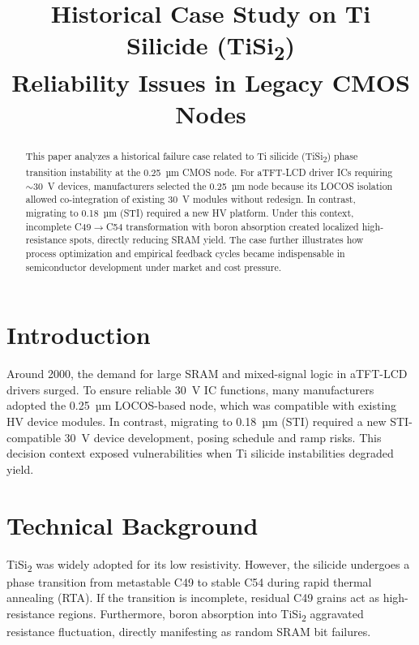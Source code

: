 \documentclass[conference]{IEEEtran}
\begin{document}
\title{Historical Case Study on Ti Silicide (TiSi\textsubscript{2}) \\ Reliability Issues in Legacy CMOS Nodes}

\author{
}

\maketitle

\begin{abstract}
This paper analyzes a historical failure case related to Ti silicide (TiSi\textsubscript{2}) phase transition instability at the 0.25~µm CMOS node. 
For aTFT-LCD driver ICs requiring $\sim$30~V devices, manufacturers selected the 0.25~µm node because its LOCOS isolation allowed co-integration of existing 30~V modules without redesign. 
In contrast, migrating to 0.18~µm (STI) required a new HV platform. 
Under this context, incomplete C49$\rightarrow$C54 transformation with boron absorption created localized high-resistance spots, directly reducing SRAM yield. 
The case further illustrates how process optimization and empirical feedback cycles became indispensable in semiconductor development under market and cost pressure.
\end{abstract}

\section{Introduction}
Around 2000, the demand for large SRAM and mixed-signal logic in aTFT-LCD drivers surged. 
To ensure reliable 30~V IC functions, many manufacturers adopted the 0.25~µm LOCOS-based node, which was compatible with existing HV device modules. 
In contrast, migrating to 0.18~µm (STI) required a new STI-compatible 30~V device development, posing schedule and ramp risks. 
This decision context exposed vulnerabilities when Ti silicide instabilities degraded yield.

\section{Technical Background}
TiSi\textsubscript{2} was widely adopted for its low resistivity. 
However, the silicide undergoes a phase transition from metastable C49 to stable C54 during rapid thermal annealing (RTA). 
If the transition is incomplete, residual C49 grains act as high-resistance regions. 
Furthermore, boron absorption into TiSi\textsubscript{2} aggravated resistance fluctuation, directly manifesting as random SRAM bit failures.
\end{document}
